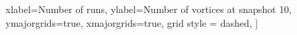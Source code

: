		xlabel={Number of runs},
		ylabel={Number of vortices at snapshot 10},
		ymajorgrids=true,
		xmajorgrids=true,
		grid style = dashed,
		]
